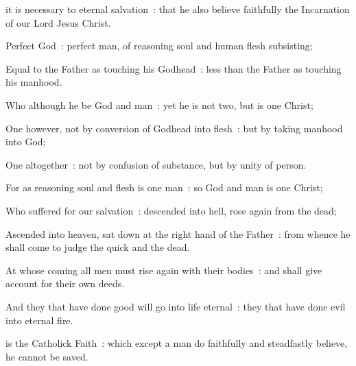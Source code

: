 {     it is necessary to eternal salvation~: that he also believe faithfully the Incarnation of our Lord Jesus Christ.\par
    Perfect God~: perfect man, of reasoning soul and human flesh subsisting;\par
    Equal to the Father as touching his Godhead~: less than the Father as touching his manhood.\par
    Who although he be God and man~: yet he is not two, but is one Christ;\par
    One however, not by conversion of Godhead into flesh~: but by taking manhood into God;\par
    One altogether~: not by confusion of substance, but by unity of person.\par
    For as reasoning soul and flesh is one man~: so God and man is one Christ;\par
    Who suffered for our salvation~: descended into hell, rose again from the dead;\par
    Ascended into heaven, sat down at the right hand of the Father~: from whence he shall come to judge the quick and the dead.\par
    At whose coming all men must rise again with their bodies~: and shall give account for their own deeds.\par
    And they that have done good will go into life eternal~: they that have done evil into eternal fire.

     is the Catholick Faith~: which except a man do faithfully and steadfastly believe, he cannot be saved.%
}
